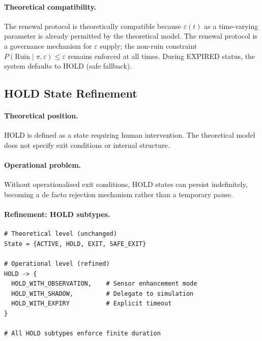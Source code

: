 \paragraph{Theoretical compatibility.}
The renewal protocol is theoretically compatible because
$\varepsilon(t)$ as a time-varying parameter is already permitted by
the theoretical model. The renewal protocol is a governance
mechanism for $\varepsilon$ supply; the non-ruin constraint
$P(\mathrm{Ruin} \mid \pi, \varepsilon) \le \varepsilon$ remains
enforced at all times. During EXPIRED status, the system defaults to
HOLD (safe fallback).

\subsection{HOLD State Refinement}
\label{sec:hold-refinement}

\paragraph{Theoretical position.}
HOLD is defined as a state requiring human intervention. The
theoretical model does not specify exit conditions or internal
structure.

\paragraph{Operational problem.}
Without operationalised exit conditions, HOLD states can persist
indefinitely, becoming a de facto rejection mechanism rather than
a temporary pause.

\paragraph{Refinement: HOLD subtypes.}

\begin{lstlisting}[basicstyle=\ttfamily\small,frame=single]
# Theoretical level (unchanged)
State = {ACTIVE, HOLD, EXIT, SAFE_EXIT}

# Operational level (refined)
HOLD -> {
  HOLD_WITH_OBSERVATION,    # Sensor enhancement mode
  HOLD_WITH_SHADOW,         # Delegate to simulation
  HOLD_WITH_EXPIRY          # Explicit timeout
}

# All HOLD subtypes enforce finite duration
\end{lstlisting}

